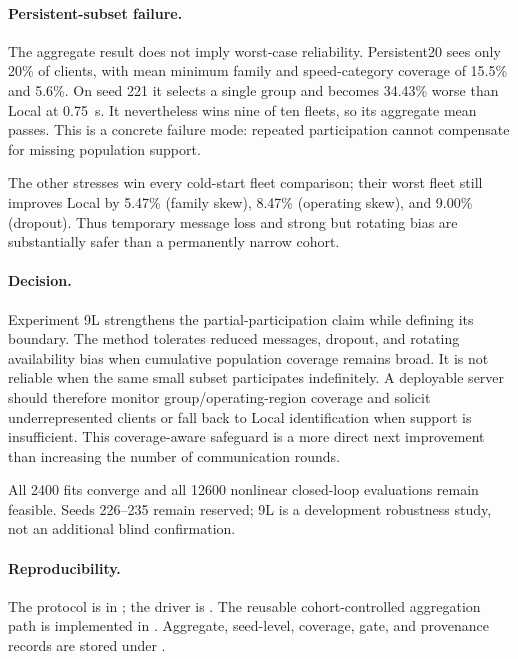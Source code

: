 \paragraph{Persistent-subset failure.}
The aggregate result does not imply worst-case reliability. Persistent20 sees
only 20\% of clients, with mean minimum family and speed-category coverage of
15.5\% and 5.6\%. On seed 221 it selects a single group and becomes 34.43\%
worse than Local at 0.75~s. It nevertheless wins nine of ten fleets, so its
aggregate mean passes. This is a concrete failure mode: repeated participation
cannot compensate for missing population support.

The other stresses win every cold-start fleet comparison; their worst fleet
still improves Local by 5.47\% (family skew), 8.47\% (operating skew), and
9.00\% (dropout). Thus temporary message loss and strong but rotating bias are
substantially safer than a permanently narrow cohort.

\paragraph{Decision.}
Experiment 9L strengthens the partial-participation claim while defining its
boundary. The method tolerates reduced messages, dropout, and rotating
availability bias when cumulative population coverage remains broad. It is not
reliable when the same small subset participates indefinitely. A deployable
server should therefore monitor group/operating-region coverage and solicit
underrepresented clients or fall back to Local identification when support is
insufficient. This coverage-aware safeguard is a more direct next improvement
than increasing the number of communication rounds.

All 2400 fits converge and all 12600 nonlinear closed-loop evaluations remain
feasible. Seeds 226--235 remain reserved; 9L is a development robustness study,
not an additional blind confirmation.

\paragraph{Reproducibility.}
The protocol is in ; the driver is
. The reusable
cohort-controlled aggregation path is implemented in
. Aggregate, seed-level,
coverage, gate, and provenance records are stored under .

